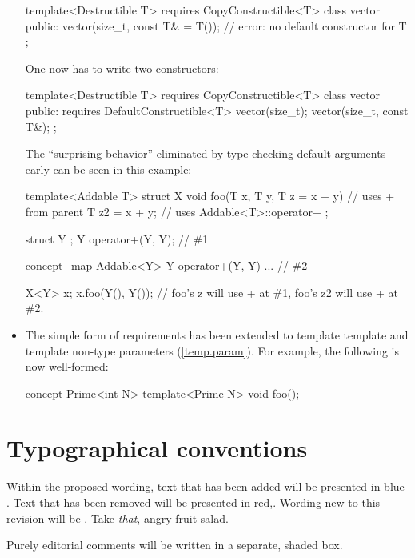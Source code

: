 \documentclass[american]{book}
\newcommand{\editorial}[1]{\colorbox{editbackground}{\begin{minipage}{\linewidth
}#1\end{minipage}}}
\begin{document}
\begin{titlepage}
\begin{itemize}
\begin{codeblock}
template<Destructible T>
requires CopyConstructible<T>
class vector {
public:
  vector(size_t, const T& = T()); // error: no default constructor for T
};
\end{codeblock}

One now has to write two constructors:
\begin{codeblock}
template<Destructible T>
requires CopyConstructible<T>
class vector {
public:
  requires DefaultConstructible<T> vector(size_t);
  vector(size_t, const T&);
};
\end{codeblock}

The ``surprising behavior'' eliminated by type-checking default
arguments early can be seen in this example:

\begin{codeblock}
template<Addable T>
struct X {
  void foo(T x, T y, T z = x + y) { // uses + from parent
    T z2 = x + y; // uses Addable<T>::operator+
  }
};

struct Y { };
Y operator+(Y, Y); // \#1

concept_map Addable<Y> {
  Y operator+(Y, Y) { ... } // \#2
}

X<Y> x;
x.foo(Y(), Y()); // foo's z will use + at \#1, foo's z2 will use + at \#2.
\end{codeblock}

\item The simple form of requirements has been extended to template
  template and template non-type parameters (\ref{temp.param}). For
  example, the following is now well-formed:
\begin{codeblock}
concept Prime<int N> { }
template<Prime N> void foo();
\end{codeblock}
\end{itemize}

\section*{Typographical conventions}
Within the proposed wording, text that has been added
\textcolor{addclr}{will be presented in blue} . Text that has been removed will be
presented \textcolor{remclr}{in red},. Wording new to this revision will be 
. Take \emph{that}, angry fruit salad.

\editorial{Purely editorial comments will be written in a separate,
  shaded box.}
\end{titlepage}
\end{document}
